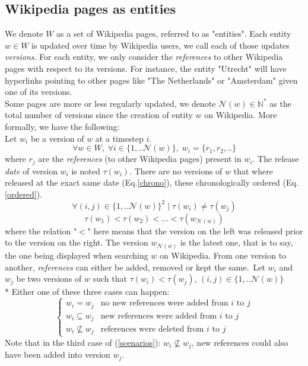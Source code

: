 \documentclass[sigconf]{acmart}
\begin{document}
\subsection{Wikipedia pages as entities}
We denote $W$ as a set of Wikipedia pages, referred to as "entities". Each entity $w \in W$ is updated over time by Wikipedia users, we call each of those updates \emph{versions}. 
For each entity, we only consider the \emph{references} to other Wikipedia pages with respect to its versions. For instance, the entity "Utrecht" will have hyperlinks pointing to other pages like "The Netherlands" or "Amsterdam" given one of its versions.\\
Some pages are more or less regularly updated, we denote $\mathcal{N}(w) \in \mathbb{N}^*$ as the total number of versions since the creation of entity $w$ on Wikipedia. More formally, we have the following:\\
Let $w_i$ be a version of $w$ at a timestep $i$.
\begin{equation}
    \label{references}
    \forall w \in W ,\; \forall i \in \{1,..\mathcal{N}(w)\}, \; w_i = \{r_1,r_2,..\}
\end{equation}
where $r_j$ are the \emph{references} (to other Wikipedia pages) present in $w_i$.
The release \emph{date} of version $w_i$ is noted $\tau(w_i)$.
There are no versions of $w$ that where released at the exact same date (Eq.\ref{chrono}), these chronologically ordered (Eq.\ref{ordered}).
\begin{equation}
    \label{chrono}
    \forall (i,j) \in \{1,..\mathcal{N}(w)\}^{2} \;| \; \tau(w_{i}) \neq \tau(w_{j})
\end{equation}
\begin{equation}
    \label{ordered}
    \tau(w_1) < \tau(w_2) < ... < \tau(w_{\mathcal{N}(w)})
\end{equation}
where the relation "$<$" here means that the version on the left was released prior to the version on the right. The version $w_{\mathcal{N}(w)}$ is the latest one, that is to say, the one being displayed when searching $w$ on Wikipedia. 
From one version to another, \emph{references} can either be added, removed or kept the same.\
Let $w_i$ and $w_j$ be two versions of $w$ such that $\tau(w_i)<\tau(w_j)$, $(i,j) \in  \{1,..\mathcal{N}(w)\}$\\*
Either one of these three cases can happen:
\begin{equation}
    \begin{cases}
    \label{scenarios}
    w_i = w_j & \text{no new references were added from $i$ to $j$} \\
    w_i \subseteq w_j & \text{new references were added from $i$ to $j$} \\
    w_i \not\subseteq w_j & \text{references were deleted from $i$ to $j$}
    \end{cases}
\end{equation}
Note that in the third case of (\ref{scenarios}): $w_i \not\subseteq w_j$, new references could also have been added into version $w_j$.
\end{document}
